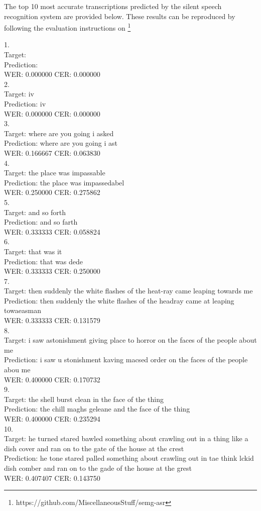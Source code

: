 The top 10 most accurate transcriptions predicted by the silent speech recognition
system are provided below. These results can be reproduced by following
the evaluation instructions on
\footnote{https://github.com/MiscellaneousStuff/semg-asr}

1.\\
 Target:     \\
 Prediction: \\
 WER: 0.000000 CER: 0.000000\\
2.\\
 Target:     iv\\
 Prediction: iv\\
 WER: 0.000000 CER: 0.000000\\
3.\\
 Target:     where are you going i asked\\
 Prediction: where are you going i ast\\
 WER: 0.166667 CER: 0.063830\\
4.\\
 Target:     the place was impassable\\
 Prediction: the place was impassedabel\\
 WER: 0.250000 CER: 0.275862\\
5.\\
 Target:     and so forth\\
 Prediction: and so farth\\
 WER: 0.333333 CER: 0.058824\\
6.\\
 Target:     that was it\\
 Prediction: that was dede\\
 WER: 0.333333 CER: 0.250000\\
7.\\
 Target:     then suddenly the white flashes of the heat-ray came leaping towards me\\
 Prediction: then suddenly the white flashes of the headray came at leaping towaeasman\\
 WER: 0.333333 CER: 0.131579\\
8.\\
 Target:     i saw astonishment giving place to horror on the faces of the people about me\\
 Prediction: i saw u stonishment kaving macsed order on the faces of the people abou me\\
 WER: 0.400000 CER: 0.170732\\
9.\\
 Target:     the shell burst clean in the face of the thing\\
 Prediction: the chill maghs geleane and the face of the thing\\
 WER: 0.400000 CER: 0.235294\\
10.\\
 Target:     he turned stared bawled something about crawling out in a thing like a dish cover and ran on to the gate of the house at the crest\\
 Prediction: he tone stared palled something about crawling out in tae think lckid dish comber and ran on to the gade of the house at the grest\\
 WER: 0.407407 CER: 0.143750